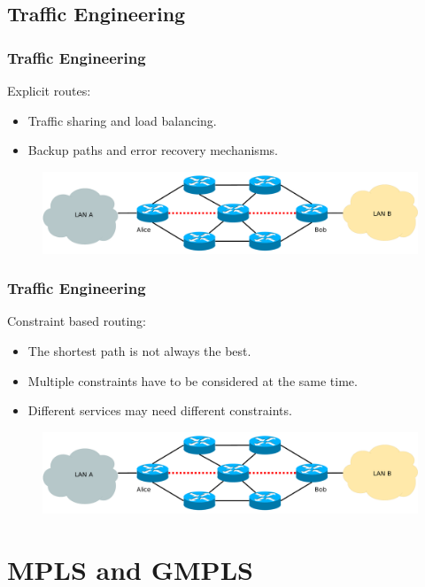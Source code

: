 \documentclass{beamer}
\begin{document}
\subsection{Traffic Engineering}
\frame
{
  \frametitle{Traffic Engineering}

  Explicit routes:
  \begin{itemize}
  \item Traffic sharing and load balancing.
  \item Backup paths and error recovery mechanisms.
  \end{itemize}

  \begin{figure}[!hbp]
    \centering
    \includegraphics[width=1\textwidth]{img/mpls_te}
  \end{figure}
}
\frame
{
  \frametitle{Traffic Engineering}

  Constraint based routing:
  \begin{itemize}
  \item The shortest path is not always the best.
  \item Multiple constraints have to be considered at the same time.
  \item Different services may need different constraints.
  \end{itemize}

  \begin{figure}[!hbp]
    \centering
    \includegraphics[width=1\textwidth]{img/mpls_te}
  \end{figure}
}

\section{MPLS and GMPLS}
\end{document}
